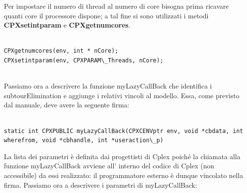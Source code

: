 \documentclass[11pt]{article}
\begin{document}
Per impostare il numero di thread al numero di core bisogna prima ricavare quanti core il processore dispone; a tal fine si sono utilizzati i metodi \textbf{CPXsetintparam} e \textbf{CPXgetnumcores}.

\begin{lstlisting}

CPXgetnumcores(env, int * nCore);
CPXsetintparam(env, CPXPARAM\_Threads, nCore);


\end{lstlisting}


Passiamo ora a descrivere la funzione myLazyCallBack che identifica i subtourElimination e aggiunge i relativi vincoli al modello. Essa, come previsto dal manuale, deve avere la seguente firma:


\begin{lstlisting}

static int CPXPUBLIC myLazyCallBack(CPXCENVptr env, void *cbdata, int wherefrom, void *cbhandle, int *useraction\_p)

\end{lstlisting}


La lista dei parametri è definita dai progettisti di Cplex poiché la chiamata alla funzione myLazyCallBack avviene all’ interno del codice di Cplex (non accessibile) da essi realizzato: il programmatore esterno è dunque vincolato nella firma. Passiamo ora a descrivere i parametri di myLazyCallBack:
\end{document}
